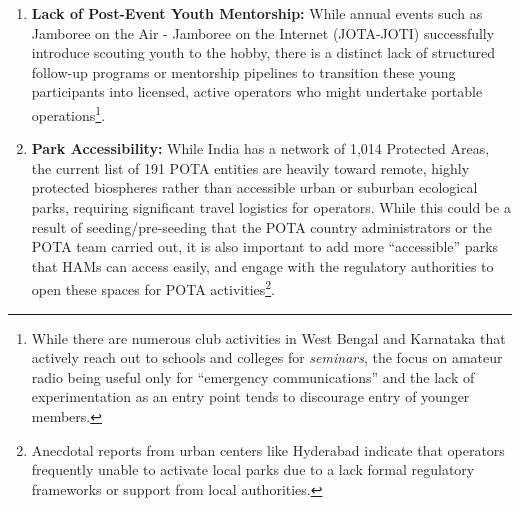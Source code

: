 \documentclass[conference]{IEEEtran}
\begin{document}
\begin{enumerate}
{      licensed operator responded, ``Thank you! HAM is probably the only
      hobby where 40s is considered young :-)''.}.
    \item \textbf{Lack of Post-Event Youth Mentorship:} While annual
      events such as Jamboree on the Air - Jamboree on the Internet
      (JOTA-JOTI)\cite{b13} successfully introduce scouting youth to
      the hobby, there is a distinct lack of structured follow-up
      programs or mentorship pipelines to transition these young
      participants into licensed, active operators who might undertake
      portable operations\footnote{While there are numerous club activities in West
      Bengal and Karnataka that actively reach out to schools and
      colleges for \textit{seminars}, the focus on amateur radio being
      useful only for ``emergency communications'' and the lack of
      experimentation as an entry point tends to discourage entry of
      younger members.}.
    \item \textbf{Park Accessibility:} While India has a network
      of 1,014 Protected Areas, the current list of 191 POTA
      entities are heavily toward remote, highly protected biospheres
      rather than accessible urban or suburban ecological parks,
      requiring significant travel logistics for operators. While this
      could be a result of seeding/pre-seeding that the POTA country
      administrators or the POTA team carried out, it is also
      important to add more ``accessible'' parks that HAMs can access
      easily, and engage with the regulatory authorities to open these
      spaces for POTA activities\footnote{Anecdotal reports from urban
        centers like Hyderabad indicate that operators frequently
        unable to activate local parks due to a lack formal regulatory
        frameworks or support from local authorities.}.
    \end{enumerate}
\end{document}
